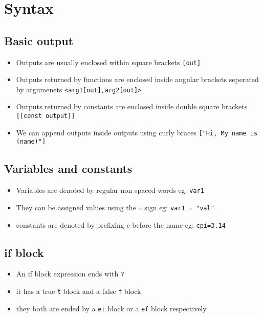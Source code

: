 \documentclass[11pt]{article}
\begin{document}
\section{Syntax}
\label{sec:org8a658b2}
\subsection{Basic output}
\label{sec:org7f589af}

\begin{itemize}
\item Outputs are usually enclosed within square brackets \texttt{[out]}
\item Outputs returned by functions are enclosed inside angular brackets seperated by argumenets \texttt{<arg1[out],arg2[out]>}
\item Outputs returned by constants are enclosed inside double square brackets \texttt{[[const output]]}
\item We can append outputs inside outputs using curly braces \texttt{["Hi, My name is (name)"]}
\end{itemize}

\subsection{Variables and constants}
\label{sec:orgf435fde}

\begin{itemize}
\item Variables are denoted by regular non spaced words eg: \texttt{var1}
\item They can be assigned values using the \texttt{=} sign eg: \texttt{var1 = "val"}
\item constants are denoted by prefixing c before the name eg: \texttt{cpi=3.14}
\end{itemize}

\subsection{if block}
\label{sec:org649d465}

\begin{itemize}
\item An if block expression ends with \texttt{?}
\item it has a true \texttt{t} block and a false \texttt{f} block
\item they both are ended by a \texttt{et} block or a \texttt{ef} block respectively
\end{itemize}
\end{document}
